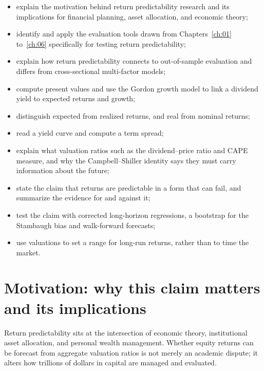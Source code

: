 \begin{itemize}
  \item explain the motivation behind return predictability research and its implications for financial planning, asset allocation, and economic theory;
  \item identify and apply the evaluation tools drawn from Chapters~\ref{ch:01} to~\ref{ch:06} specifically for testing return predictability;
  \item explain how return predictability connects to out-of-sample evaluation and differs from cross-sectional multi-factor models;
  \item compute present values and use the Gordon growth model to link a dividend yield to expected returns and growth;
  \item distinguish expected from realized returns, and real from nominal returns;
  \item read a yield curve and compute a term spread;
  \item explain what valuation ratios such as the dividend--price ratio and CAPE measure, and why the Campbell--Shiller identity says they must carry information about the future;
  \item state the claim that returns are predictable in a form that can fail, and summarize the evidence for and against it;
  \item test the claim with corrected long-horizon regressions, a bootstrap for the Stambaugh bias and walk-forward forecasts;
  \item use valuations to set a range for long-run returns, rather than to time the market.
\end{itemize}

\section{Motivation: why this claim matters and its implications}
\label{sec:07-motivation}

Return predictability sits at the intersection of economic theory, institutional asset allocation, and personal wealth management. Whether equity returns can be forecast from aggregate valuation ratios is not merely an academic dispute; it alters how trillions of dollars in capital are managed and evaluated.


